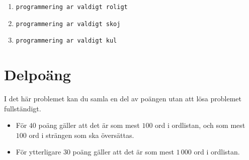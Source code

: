 \begin{enumerate}
    \item \texttt{programmering ar valdigt roligt}
    \item \texttt{programmering ar valdigt skoj}
    \item \texttt{programmering ar valdigt kul}
\end{enumerate}

\section*{Delpoäng}
I det här problemet kan du samla en del av poängen utan att lösa problemet fullständigt.

\begin{itemize}
    \item För $40$ poäng gäller att det är som mest $100$ ord i ordlistan, och som mest $100$ ord i strängen som ska översättas.
    \item För ytterligare 30 poäng gäller att det är som mest $1\,000$ ord i ordlistan.
\end{itemize}
